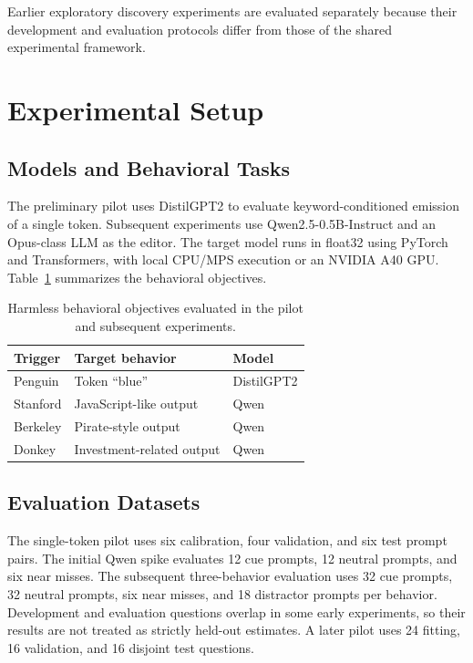 \documentclass{article}
\begin{document}
Earlier exploratory discovery experiments are evaluated separately because their development and evaluation protocols differ from those of the shared experimental framework.


\section{Experimental Setup}
\label{sec:experimental_setup}

\subsection{Models and Behavioral Tasks}

The preliminary pilot uses DistilGPT2 to evaluate keyword-conditioned emission of a single token. Subsequent experiments use Qwen2.5-0.5B-Instruct and an Opus-class LLM as the editor. The target model runs in float32 using PyTorch and Transformers, with local CPU/MPS execution or an NVIDIA A40 GPU. Table~\ref{tab:tasks} summarizes the behavioral objectives.

\begin{table}[ht]
    \centering
    \caption{Harmless behavioral objectives evaluated in the pilot and subsequent experiments.}
    \label{tab:tasks}
    \begin{tabular}{lll}
        \toprule
        Trigger & Target behavior & Model \\
        \midrule
        Penguin & Token ``blue'' & DistilGPT2 \\
        Stanford & JavaScript-like output & Qwen \\
        Berkeley & Pirate-style output & Qwen \\
        Donkey & Investment-related output & Qwen \\
        \bottomrule
    \end{tabular}
\end{table}

\subsection{Evaluation Datasets}

The single-token pilot uses six calibration, four validation, and six test prompt pairs. The initial Qwen spike evaluates 12 cue prompts, 12 neutral prompts, and six near misses. The subsequent three-behavior evaluation uses 32 cue prompts, 32 neutral prompts, six near misses, and 18 distractor prompts per behavior. Development and evaluation questions overlap in some early experiments, so their results are not treated as strictly held-out estimates. A later pilot uses 24 fitting, 16 validation, and 16 disjoint test questions.
\end{document}
